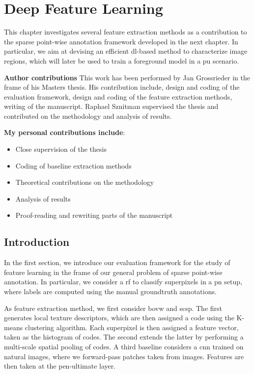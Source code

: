 \chapter{Deep Feature Learning}
This chapter investigates several feature extraction methods as a contribution to the sparse point-wise annotation framework developed in the next chapter.
In particular, we aim at devising an efficient \gls{dl}-based method to characterize image regions, which will later be used to train a foreground model in a \gls{pu} scenario.

\textbf{Author contributions} This work has been performed by Jan Grossrieder in the frame of his Masters thesis.
His contribution include, design and coding of the evaluation framework, design and coding of the feature extraction methods, writing of the manuscript.
Raphael Sznitman supervised the thesis and contributed on the methodology and analysis of results.

\textbf{My personal contributions include}:
\begin{itemize}
    \item Close supervision of the thesis
    \item Coding of baseline extraction methods
    \item Theoretical contributions on the methodology
    \item Analysis of results
    \item Proof-reading and rewriting parts of the manuscript
\end{itemize}

\section{Introduction}

In the first section, we introduce our evaluation framework for the study of feature learning in the frame of our general problem of sparse point-wise annotation.
In particular, we consider a \gls{rf} to classify superpixels in a \gls{pn} setup,
where labels are computed using the manual groundtruth annotations.

As feature extraction method, we first consider \gls{bovw} and \gls{scsp}.
The first generates local texture descriptors, which are then assigned a code using the K-means clustering algorithm.
Each superpixel is then assigned a feature vector, taken as the histogram of codes.
The second extends the latter by performing a multi-scale spatial pooling of codes.
A third baseline considers a \gls{cnn} trained on natural images, where we forward-pass patches taken from images.
Features are then taken at the pen-ultimate layer.

